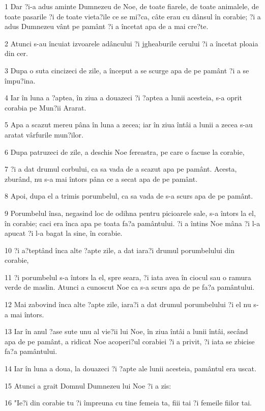 \par 1 Dar ?i-a adus aminte Dumnezeu de Noe, de toate fiarele, de toate animalele, de toate pasarile ?i de toate vieta?ile ce se mi?ca, câte erau cu dânsul în corabie; ?i a adus Dumnezeu vânt pe pamânt ?i a încetat apa de a mai cre?te.
\par 2 Atunci s-au încuiat izvoarele adâncului ?i jgheaburile cerului ?i a încetat ploaia din cer.
\par 3 Dupa o suta cincizeci de zile, a început a se scurge apa de pe pamânt ?i a se împu?ina.
\par 4 Iar în luna a ?aptea, în ziua a douazeci ?i ?aptea a lunii acesteia, s-a oprit corabia pe Mun?ii Ararat.
\par 5 Apa a scazut mereu pâna în luna a zecea; iar în ziua întâi a lunii a zecea s-au aratat vârfurile mun?ilor.
\par 6 Dupa patruzeci de zile, a deschis Noe fereastra, pe care o facuse la corabie,
\par 7 ?i a dat drumul corbului, ca sa vada de a scazut apa pe pamânt. Acesta, zburând, nu s-a mai întors pâna ce a secat apa de pe pamânt.
\par 8 Apoi, dupa el a trimis porumbelul, ca sa vada de s-a scurs apa de pe pamânt.
\par 9 Porumbelul însa, negasind loc de odihna pentru picioarele sale, s-a întors la el, în corabie; caci era înca apa pe toata fa?a pamântului. ?i a întins Noe mâna ?i l-a apucat ?i l-a bagat la sine, în corabie.
\par 10 ?i a?teptând înca alte ?apte zile, a dat iara?i drumul porumbelului din corabie,
\par 11 ?i porumbelul s-a întors la el, spre seara, ?i iata avea în ciocul sau o ramura verde de maslin. Atunci a cunoscut Noe ca s-a scurs apa de pe fa?a pamântului.
\par 12 Mai zabovind înca alte ?apte zile, iara?i a dat drumul porumbelului ?i el nu s-a mai întors.
\par 13 Iar în anul ?ase sute unu al vie?ii lui Noe, în ziua întâi a lunii întâi, secând apa de pe pamânt, a ridicat Noe acoperi?ul corabiei ?i a privit, ?i iata se zbicise fa?a pamântului.
\par 14 Iar în luna a doua, la douazeci ?i ?apte ale lunii acesteia, pamântul era uscat.
\par 15 Atunci a grait Domnul Dumnezeu lui Noe ?i a zis:
\par 16 "Ie?i din corabie tu ?i împreuna cu tine femeia ta, fiii tai ?i femeile fiilor tai.
